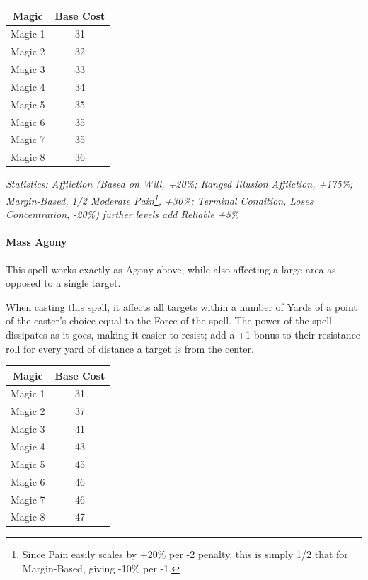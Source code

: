 \begin{multicols*}{3}
	\begin{center}
		\begin{tabular}{|c|c|}
			\hline
			Magic & Base Cost \\
			\hline
			\hline
			Magic 1 & 31 \\
			Magic 2 & 32 \\
			Magic 3 & 33 \\
			Magic 4 & 34 \\
			Magic 5 & 35 \\
			Magic 6 & 35 \\
			Magic 7 & 35 \\
			Magic 8 & 36 \\
			\hline
		\end{tabular}
	\end{center}

	\textcolor{OliveGreen}{\textit{Statistics: Affliction (Based on Will, +20\%; Ranged Illusion Affliction, +175\%; Margin-Based, 1/2 Moderate Pain\footnote{Since Pain easily scales by +20\% per -2 penalty, this is simply 1/2 that for Margin-Based, giving -10\% per -1.}, +30\%; Terminal Condition, Loses Concentration, -20\%)  further levels add Reliable +5\%}}
	
	\paragraph{Mass Agony}
	
	This spell works exactly as Agony above, while also affecting a large area as opposed to a single target.
	
	When casting this spell, it affects all targets within a number of Yards of a point of the caster's choice equal to the Force of the spell. The power of the spell dissipates as it goes, making it easier to resist; add a +1 bonus to their resistance roll for every yard of distance a target is from the center.
	
		\begin{center}
		\begin{tabular}{|c|c|}
			\hline
			Magic & Base Cost \\
			\hline
			\hline
			Magic 1 & 31 \\
			Magic 2 & 37 \\
			Magic 3 & 41 \\
			Magic 4 & 43 \\
			Magic 5 & 45 \\
			Magic 6 & 46 \\
			Magic 7 & 46 \\
			Magic 8 & 47 \\
			\hline
		\end{tabular}
	\end{center}
	

\end{multicols*}
